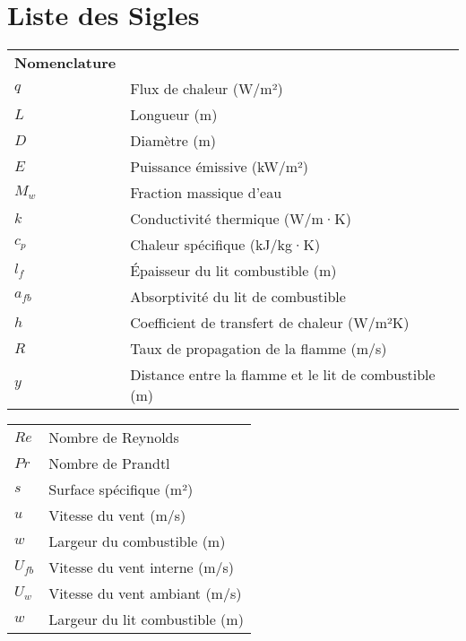 \documentclass[12pt, oneside]{report} %
\theoremstyle{definition}
\theoremstyle{remark}
\begin{document}
	\tableofcontents
	
	\chapter*{Liste des Sigles}
	\renewcommand{\arraystretch}{1} %
	
\begin{minipage}[t]{0.48\textwidth}
	\begin{tabular}[t]{@{}p{1.2cm}p{10cm}@{}}
		\textbf{Nomenclature} \\
		$q$ & Flux de chaleur (W/m²) \\
		$L$ & Longueur (m) \\
		$D$ & Diamètre (m) \\
		$E$ & Puissance émissive (kW/m²) \\
		$M_w$ & Fraction massique d'eau \\
		$k$ & Conductivité thermique (W/m·K) \\
		$c_p$ & Chaleur spécifique (kJ/kg·K) \\
		$l_f$ & Épaisseur du lit combustible (m) \\ 
			$a_{fb}$ & Absorptivité du lit de combustible \\
		$h$ & Coefficient de transfert de chaleur (W/m²K)\\
		$R$ & Taux de propagation de la flamme (m/s) \\
		$y$ & Distance entre la flamme et le lit de combustible (m) \\
	\end{tabular}
\end{minipage}
\hfil
\begin{minipage}[t]{0.48\textwidth} %
	\begin{tabular}[t]{@{}p{1.2cm}p{10cm}@{}} %
		\\
		$Re$ & Nombre de Reynolds \\
		$Pr$ & Nombre de Prandtl \\
		$s$ & Surface spécifique (m²) \\
		$u$ & Vitesse du vent (m/s) \\ 
		$w$ & Largeur du combustible (m) \\
		$U_{fb}$ & Vitesse du vent interne (m/s) \\
		$U_w$ & Vitesse du vent ambiant (m/s) \\
		$w$ & Largeur du lit combustible (m) \\
	\end{tabular}
\end{minipage}
	
\end{document}
